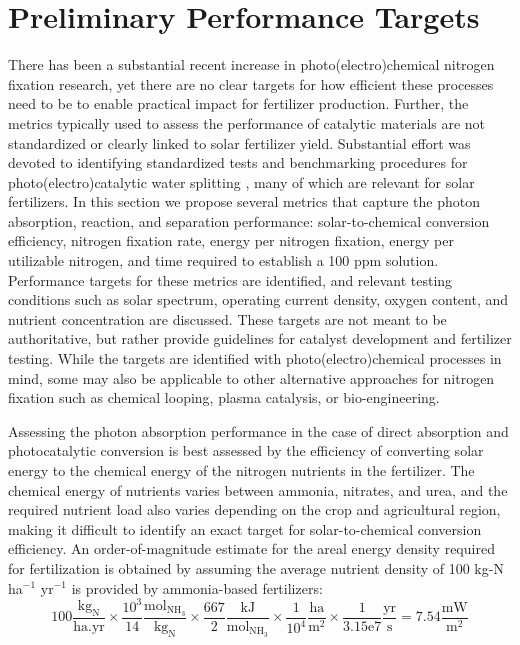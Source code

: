 \section{Preliminary Performance Targets}
\label{sec:targets}

There has been a substantial recent increase in photo(electro)chemical nitrogen fixation research, yet there are no clear targets for how efficient these processes need to be to enable practical impact for fertilizer production. Further, the metrics typically used to assess the performance of catalytic materials are not standardized or clearly linked to solar fertilizer yield. Substantial effort was devoted to identifying standardized tests and benchmarking procedures for photo(electro)catalytic water splitting \cite{Chen_2010, McCrory_2013, McCrory_2015, Smith_2016, Bligaard_2016,martin2018electrocatalytic}, many of which are relevant for solar fertilizers. In this section we propose several metrics that capture the photon absorption, reaction, and separation performance: solar-to-chemical conversion efficiency, nitrogen fixation rate, energy per nitrogen fixation, energy per utilizable nitrogen, and time required to establish a 100 ppm solution. Performance targets for these metrics are identified, and relevant testing conditions such as solar spectrum, operating current density, oxygen content, and nutrient concentration are discussed. These targets are not meant to be authoritative, but rather provide guidelines for catalyst development and fertilizer testing. While the targets are identified with photo(electro)chemical processes in mind, some may also be applicable to other alternative approaches for nitrogen fixation such as chemical looping, plasma catalysis, or bio-engineering.

Assessing the photon absorption performance in the case of direct absorption and photocatalytic conversion is best assessed by the efficiency of converting solar energy to the chemical energy of the nitrogen nutrients in the fertilizer. The chemical energy of nutrients varies between ammonia, nitrates, and urea, and the required nutrient load also varies depending on the crop and agricultural region, making it difficult to identify an exact target for solar-to-chemical conversion efficiency. An order-of-magnitude estimate for the areal energy density required for fertilization is obtained by assuming the average nutrient density of 100 kg-N ha$^{-1}$ yr$^{-1}$ is provided by ammonia-based fertilizers:
\begin{equation}
\mathrm{
100 \frac{kg_N}{ha . yr} \times \frac{10^3}{14} \frac{mol_{NH_3}}{kg_N} \times \frac{667}{2} \frac{kJ}{mol_{NH_3}} \times \frac{1}{10^4} \frac{ha}{m^2} \times \frac{1}{3.15e7} \frac{yr}{s} = 7.54 \frac{mW}{m^2}
}
\end{equation}


